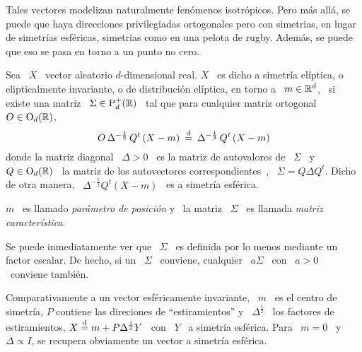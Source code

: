 Tales  vectores  modelizan naturalmente  fen\'omenos  isotr\'opicos. Pero  m\'as
all\'a,  se  puede  que  haya  direcciones privilegiadas  ortogonales  pero  con
simetrias,  \ie en  lugar de  simetr\'ias esf\'ericas,  simetr\'ias como  en una
pelota de rugby. Adem\'as, se puede que eso se pasa en torno a un punto no cero.
%
\begin{definicion}
%
  Sea  \  $X$  \ vector  aleatorio  $d$-dimensional  real.   $X$  \ es  dicho  a
  simetr\'ia  el\'iptica,  o  elipticalmente  invariante,  o  de  distribuci\'on
  el\'iptica, en torno a \ $m \in \mathbb{R}^d$, \ si existe una matriz \ $\Sigma \in
  \mathrm{P}_d^+(\mathbb{R})$  \  tal  que  para   cualquier  matriz  ortogonal  \  $O  \in
  \mathrm{O}_d(\mathbb{R})$,
  \[
  O  \,   \Delta^{-\frac12}  \,  Q^t  \left(   X  -  m  \right)   \:  \stackrel{\mathrm{d}}{=}  \:
  \Delta^{-\frac12} \, Q^t \left( X - m \right)
  \]
  donde la  matriz diagonal \ $\Delta  > 0$ \ es  la matriz de  autovalores de \
  $\Sigma$  \  y  \ $Q  \in  \mathrm{O}_d(\mathbb{R})$  \  la  matriz de  los  autovectores
  correspondientes~\cite{Bha97,   Bha07,  HorJoh13},  \   $\Sigma  =   Q  \Delta
  Q^t$. Dicho de  otra manera, \ $\Delta^{-\frac12} Q^t \left( X  - m \right)$ \
  es a simetr\'ia esf\'erica.

  $m$ \ es llamado {\em par\'ametro de posici\'on} y \ la matriz \ $\Sigma$ \ es
  llamada {\em matriz caracter\'istica}.
\end{definicion}
%
Se puede inmediatamente  ver que \ $\Sigma$ \ es definida  por lo menos mediante
un factor escalar. De hecho, si un \ $\Sigma$ \ conviene, cualquier \ $a \Sigma$
\ con \ $a > 0$ \ conviene tambi\'en.

Comparativamente a un vector esf\'ericamente invariante, \ $m$ \ es el centro de
simetr\'ia,   $P$   contiene   las   direciones   de   ``estiramientos''   y   \
$\Delta^{\frac12}$  \   los  factores  de   estiramientos,  $X  \stackrel{\mathrm{d}}{=}  m   +  P
\Delta^{\frac12} Y$ \ con \ $Y$ \ a  simetr\'ia esf\'erica. Para \ $m = 0$ \ y \
$\Delta \propto I$, se recupera obviamente un vector a simetr\'ia esf\'erica.

